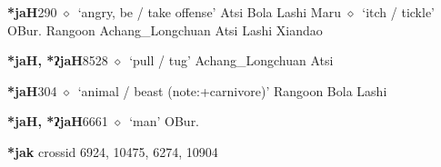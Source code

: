   \begin{list}{}{\leftmargin=1.5em \itemindent=-1.5em}
  \item {\footnotesize \textbf{*jaH}}{\tiny 290}
         $\diamond$~`angry, be / take offense'
         Atsi 
\hspace{1ex}
         Bola 
\hspace{1ex}
         Lashi 
\hspace{1ex}
         Maru 
\hspace{1ex}
         $\diamond$~`itch / tickle'
         OBur. 
\hspace{1ex}
         Rangoon 
\hspace{1ex}
         Achang\_Longchuan 
\hspace{1ex}
         Atsi 
\hspace{1ex}
         Lashi 
\hspace{1ex}
         Xiandao 
  \item {\footnotesize \textbf{*jaH, *ʔjaH}}{\tiny 8528}
\hspace{1ex}
         $\diamond$~`pull / tug'
         Achang\_Longchuan 
\hspace{1ex}
         Atsi 
  \item {\footnotesize \textbf{*jaH}}{\tiny 304}
\hspace{1ex}
         $\diamond$~`animal / beast (note:+carnivore)'
         Rangoon 
\hspace{1ex}
         Bola 
\hspace{1ex}
         Lashi 
  \item {\footnotesize \textbf{*jaH, *ʔjaH}}{\tiny 6661}
\hspace{1ex}
         $\diamond$~`man'
         OBur. 
  \end{list}
\item
\textbf{*jak}
  {\tiny crossid 6924, 10475, 6274, 10904}
